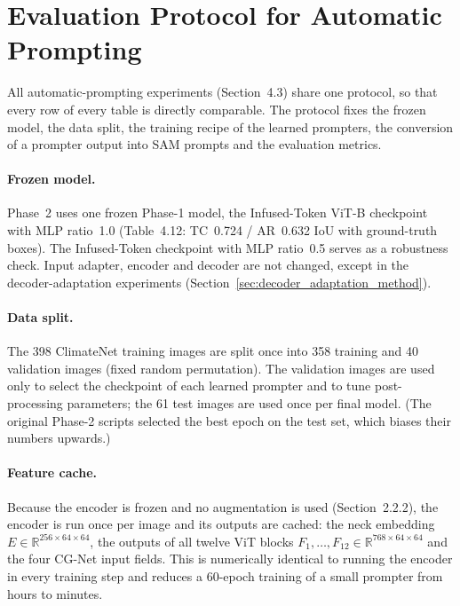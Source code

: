 
\section{Evaluation Protocol for Automatic Prompting}
\label{sec:prompting_protocol}

All automatic-prompting experiments (Section~4.3) share one protocol, so that every row of every table is directly
comparable. The protocol fixes the frozen model, the data split, the training recipe of the learned prompters, the
conversion of a prompter output into SAM prompts and the evaluation metrics.

\paragraph{Frozen model.}
Phase~2 uses one frozen Phase-1 model, the Infused-Token ViT-B checkpoint with MLP ratio~1.0 (Table~4.12:
TC~0.724 / AR~0.632 IoU with ground-truth boxes). The Infused-Token checkpoint with MLP ratio~0.5 serves as a
robustness check. Input adapter, encoder and decoder are not changed, except in the decoder-adaptation experiments
(Section~\ref{sec:decoder_adaptation_method}).

\paragraph{Data split.}
The 398 ClimateNet training images are split once into 358 training and 40 validation images (fixed random
permutation). The validation images are used only to select the checkpoint of each learned prompter and to tune
post-processing parameters; the 61 test images are used once per final model. (The original Phase-2 scripts selected
the best epoch on the test set, which biases their numbers upwards.)

\paragraph{Feature cache.}
Because the encoder is frozen and no augmentation is used (Section~2.2.2), the encoder is run once per image and its
outputs are cached: the neck embedding $E\in\mathbb{R}^{256\times64\times64}$, the outputs of all twelve ViT blocks
$F_1,\dots,F_{12}\in\mathbb{R}^{768\times64\times64}$ and the four CG-Net input fields. This is numerically identical
to running the encoder in every training step and reduces a 60-epoch training of a small prompter from hours to minutes.

